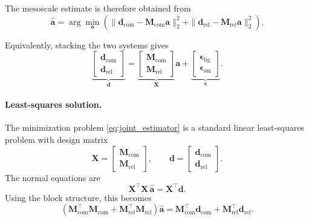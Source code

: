 \documentclass{article}
\begin{document}
The mesoscale estimate is therefore obtained from
\begin{equation}
\hat{\mathbf a}
=
\arg\min_{\mathbf a}
\left(
\|
\mathbf{d}_{\mathrm{com}}-\mathbf{M}_{\mathrm{com}}\mathbf a
\|_2^2
+
\|
\mathbf{d}_{\mathrm{rel}}-\mathbf{M}_{\mathrm{rel}}\mathbf a
\|_2^2
\right).
\label{eq:joint_estimator}
\end{equation}

Equivalently, stacking the two systems gives
\begin{equation}
\underbrace{
\begin{bmatrix}
\mathbf{d}_{\mathrm{com}}\\
\mathbf{d}_{\mathrm{rel}}
\end{bmatrix}}_{\mathbf d}
=
\underbrace{
\begin{bmatrix}
\mathbf{M}_{\mathrm{com}}\\
\mathbf{M}_{\mathrm{rel}}
\end{bmatrix}}_{\mathbf X}
\mathbf a
+
\underbrace{
\begin{bmatrix}
\boldsymbol{\epsilon}_{\mathrm{bg}}\\
\boldsymbol{\epsilon}_{\mathrm{sm}}
\end{bmatrix}}_{\boldsymbol{\epsilon}}.
\label{eq:joint_stacked_system}
\end{equation}

\paragraph{Least-squares solution.}

The minimization problem \eqref{eq:joint_estimator} is a standard linear
least-squares problem with design matrix
\begin{equation}
\mathbf X =
\begin{bmatrix}
\mathbf{M}_{\mathrm{com}}\\
\mathbf{M}_{\mathrm{rel}}
\end{bmatrix},
\qquad
\mathbf d =
\begin{bmatrix}
\mathbf{d}_{\mathrm{com}}\\
\mathbf{d}_{\mathrm{rel}}
\end{bmatrix}.
\end{equation}
The normal equations are
\begin{equation}
\mathbf X^\top \mathbf X\, \hat{\mathbf a}
=
\mathbf X^\top \mathbf d.
\end{equation}
Using the block structure, this becomes
\begin{equation}
\left(
\mathbf{M}_{\mathrm{com}}^\top \mathbf{M}_{\mathrm{com}}
+
\mathbf{M}_{\mathrm{rel}}^\top \mathbf{M}_{\mathrm{rel}}
\right)\hat{\mathbf a}
=
\mathbf{M}_{\mathrm{com}}^\top \mathbf{d}_{\mathrm{com}}
+
\mathbf{M}_{\mathrm{rel}}^\top \mathbf{d}_{\mathrm{rel}}.
\label{eq:normal_equations}
\end{equation}
\end{document}

